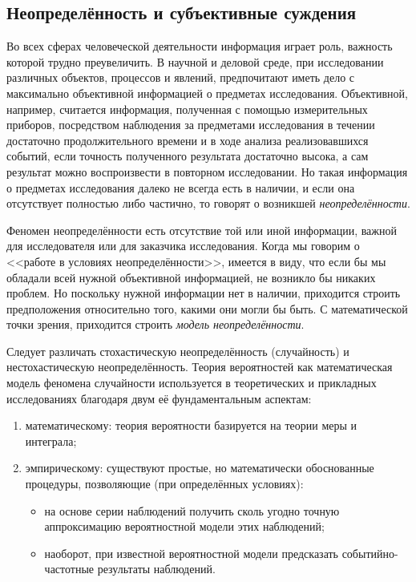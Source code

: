 
\subsection{Неопределённость и субъективные суждения}
\label{sec:intro_uncertainty}

Во всех сферах человеческой деятельности информация играет роль, важность которой трудно преувеличить. В научной и деловой среде, при исследовании различных объектов, процессов и явлений,  предпочитают иметь дело с максимально объективной информацией о предметах исследования. Объективной, например, считается информация, полученная с помощью измерительных приборов, посредством наблюдения за предметами исследования в течении достаточно продолжительного времени и в ходе анализа реализовавшихся событий, если точность полученного результата достаточно высока, а сам результат можно воспроизвести в повторном исследовании. Но такая информация о предметах исследования далеко не всегда есть в наличии, и если она отсутствует полностью либо частично, то говорят о возникшей {\sl неопределённости}. 

Феномен неопределённости есть отсутствие той или иной информации, важной для исследователя или для заказчика исследования. Когда мы говорим о <<работе в условиях неопределённости>>, имеется в виду, что если бы мы обладали всей нужной объективной информацией, не возникло бы никаких проблем. Но поскольку нужной информации  нет в наличии, приходится строить предположения относительно того, какими они могли бы быть. С математической точки зрения, приходится строить {\sl модель неопределённости}. 

Следует различать стохастическую неопределённость (случайность) и нестохастическую неопределённость. Теория вероятностей как математическая модель феномена случайности используется в теоретических и прикладных исследованиях благодаря двум её фундаментальным аспектам:
\begin{enumerate}
  \item математическому: теория вероятности базируется на теории меры и интеграла;
  \item эмпирическому: существуют простые, но математически обоснованные процедуры, позволяющие (при определённых условиях):
  \begin{itemize}
  \item  на основе серии наблюдений получить сколь угодно точную аппроксимацию вероятностной модели этих наблюдений;
  \item наоборот, при известной вероятностной модели предсказать событийно-частотные результаты наблюдений. 
  \end{itemize} 
\end{enumerate}

